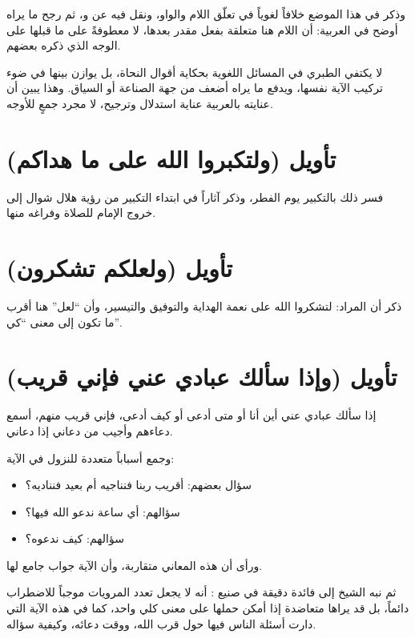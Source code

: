 وذكر  في هذا الموضع خلافاً لغوياً في تعلّق اللام والواو، ونقل فيه عن  و، ثم رجح ما يراه أوضح في العربية: أن اللام هنا متعلقة بفعل مقدر بعدها، لا معطوفةً على ما قبلها على الوجه الذي ذكره بعضهم.

\begin{fawaid}
لا يكتفي الطبري في المسائل اللغوية بحكاية أقوال النحاة، بل يوازن بينها في ضوء تركيب الآية نفسها، ويدفع ما يراه أضعف من جهة الصناعة أو السياق. وهذا يبين أن عنايته بالعربية عناية استدلال وترجيح، لا مجرد جمعٍ للأوجه.
\end{fawaid}

\section{تأويل (ولتكبروا الله على ما هداكم)}
فسر  ذلك بالتكبير يوم الفطر، وذكر آثاراً في ابتداء التكبير من رؤية هلال شوال إلى خروج الإمام للصلاة وفراغه منها.

\section{تأويل (ولعلكم تشكرون)}
ذكر أن المراد: لتشكروا الله على نعمة الهداية والتوفيق والتيسير، وأن ``لعل'' هنا أقرب ما تكون إلى معنى ``كي''.

\separator

\section{تأويل (وإذا سألك عبادي عني فإني قريب)}
 إذا سألك عبادي عني أين أنا أو متى أدعى أو كيف أدعى، فإني قريب منهم، أسمع دعاءهم وأجيب من دعاني إذا دعاني.

وجمع  أسباباً متعددة للنزول في الآية:
\begin{itemize}
    \item سؤال بعضهم: أقريب ربنا فنناجيه أم بعيد فنناديه؟
    \item سؤالهم: أي ساعة ندعو الله فيها؟
    \item سؤالهم: كيف ندعوه؟
\end{itemize}

ورأى أن هذه المعاني متقاربة، وأن الآية جواب جامع لها.

ثم نبه الشيخ إلى فائدة دقيقة في صنيع : أنه لا يجعل تعدد المرويات موجباً للاضطراب دائماً، بل قد يراها متعاضدة إذا أمكن حملها على معنى كلي واحد، كما في هذه الآية التي دارت أسئلة الناس فيها حول قرب الله، ووقت دعائه، وكيفية سؤاله.

